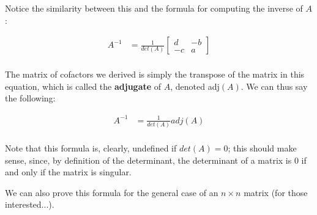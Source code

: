 \documentclass[12pt]{article}
\begin{document}
{Notice the similarity between this and the formula for computing the inverse of $A$:

\begin{equation}
    \begin{split}
    A^{-1} &= \frac{1}{det(A)}\begin{bmatrix}
       d & -b\\
        -c & a
    \end{bmatrix}\\
    \end{split}
\end{equation}

The matrix of cofactors we derived is simply the transpose of the matrix in this equation, which is called the \textbf{adjugate} of $A$, denoted adj$(A)$. We can thus say the following:

\begin{equation}
    \begin{split}
    A^{-1} &= \frac{1}{det(A)}adj(A)\\
    \end{split}
\end{equation}

Note that this formula is, clearly, undefined if $det(A) = 0$; this should make sense, since, by definition of the determinant, the determinant of a matrix is 0 if and only if the matrix is singular.

We can also prove this formula for the general case of an $n \times n$ matrix (for those interested...).

\renewcommand{\qedsymbol}{$\blacksquare$}

}
\end{document}
